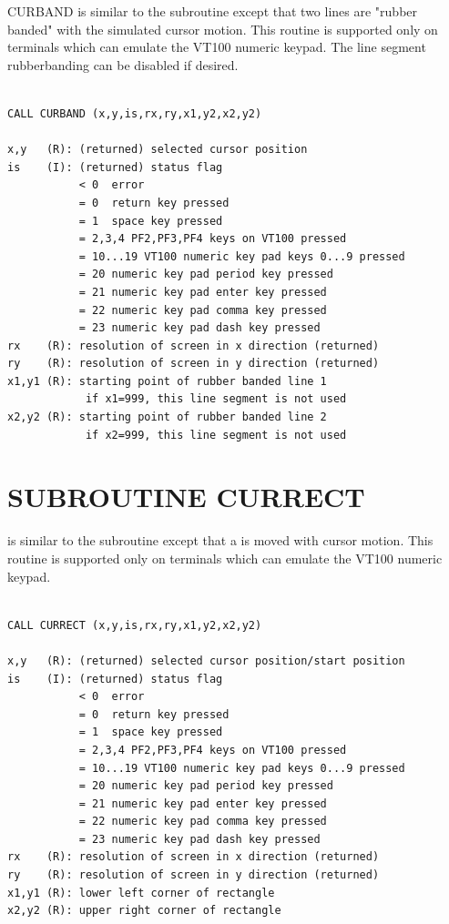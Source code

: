 \documentclass[11pt]{report}
\begin{document}
CURBAND is similar to the  subroutine except that two
lines are "rubber banded" with the simulated cursor motion.  This
routine is supported only on terminals which can emulate the VT100
numeric keypad.  The line segment rubberbanding can be disabled if
desired.
\begin{verbatim}

CALL CURBAND (x,y,is,rx,ry,x1,y2,x2,y2)

x,y   (R): (returned) selected cursor position
is    (I): (returned) status flag
           < 0  error
           = 0  return key pressed
           = 1  space key pressed
           = 2,3,4 PF2,PF3,PF4 keys on VT100 pressed
           = 10...19 VT100 numeric key pad keys 0...9 pressed
           = 20 numeric key pad period key pressed
           = 21 numeric key pad enter key pressed
           = 22 numeric key pad comma key pressed
           = 23 numeric key pad dash key pressed
rx    (R): resolution of screen in x direction (returned)
ry    (R): resolution of screen in y direction (returned)
x1,y1 (R): starting point of rubber banded line 1
            if x1=999, this line segment is not used
x2,y2 (R): starting point of rubber banded line 2
            if x2=999, this line segment is not used
\end{verbatim}

\section{SUBROUTINE CURRECT}

 is similar to the  subroutine except that a
 is moved with cursor motion.  This
routine is supported only on terminals which can emulate the VT100
numeric keypad.
\begin{verbatim}

CALL CURRECT (x,y,is,rx,ry,x1,y2,x2,y2)

x,y   (R): (returned) selected cursor position/start position
is    (I): (returned) status flag
           < 0  error
           = 0  return key pressed
           = 1  space key pressed
           = 2,3,4 PF2,PF3,PF4 keys on VT100 pressed
           = 10...19 VT100 numeric key pad keys 0...9 pressed
           = 20 numeric key pad period key pressed
           = 21 numeric key pad enter key pressed
           = 22 numeric key pad comma key pressed
           = 23 numeric key pad dash key pressed
rx    (R): resolution of screen in x direction (returned)
ry    (R): resolution of screen in y direction (returned)
x1,y1 (R): lower left corner of rectangle
x2,y2 (R): upper right corner of rectangle
\end{verbatim}
\end{document}
